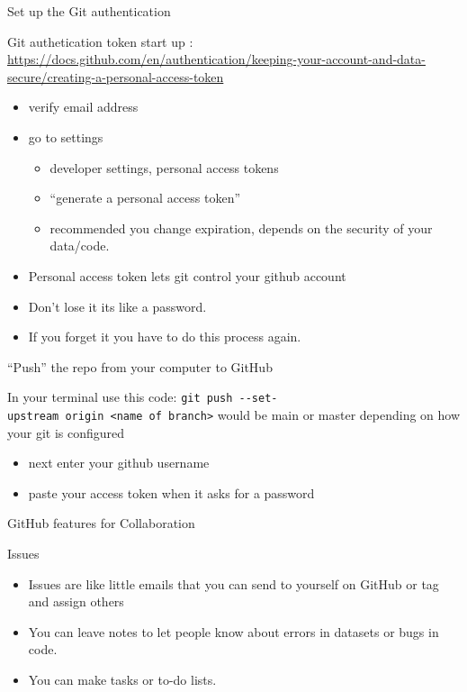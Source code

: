 \documentclass[ignorenonframetext,]{beamer}
\providecommand{\tightlist}{%
  \setlength{\itemsep}{0pt}\setlength{\parskip}{0pt}}
\begin{document}
\begin{frame}{Set up the Git authentication}

Git authetication token start up :
\url{https://docs.github.com/en/authentication/keeping-your-account-and-data-secure/creating-a-personal-access-token}

\begin{itemize}
\tightlist
\item
  verify email address
\item
  go to settings

  \begin{itemize}
  \tightlist
  \item
    developer settings, personal access tokens
  \item
    ``generate a personal access token''
  \item
    recommended you change expiration, depends on the security of your
    data/code.
  \end{itemize}
\item
  Personal access token lets git control your github account
\item
  Don't lose it its like a password.
\item
  If you forget it you have to do this process again.
\end{itemize}

\end{frame}

\begin{frame}[fragile]{``Push'' the repo from your computer to GitHub}

In your terminal use this code:
\texttt{git\ push\ -\/-set-upstream\ origin\ \textless{}name\ of\ branch\textgreater{}}
would be main or master depending on how your git is configured

\begin{itemize}
\tightlist
\item
  next enter your github username
\item
  paste your access token when it asks for a password
\end{itemize}

\end{frame}

\begin{frame}{GitHub features for Collaboration}

\end{frame}

\begin{frame}{Issues}

\begin{itemize}
\tightlist
\item
  Issues are like little emails that you can send to yourself on GitHub
  or tag and assign others
\item
  You can leave notes to let people know about errors in datasets or
  bugs in code.
\item
  You can make tasks or to-do lists.
\end{itemize}

\end{frame}
\end{document}
